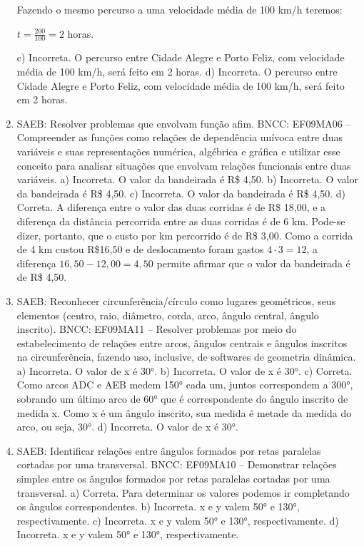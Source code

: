 \begin{enumerate}
Fazendo o mesmo percurso a uma velocidade média de 100 km/h teremos:

$t = \frac{200}{100} = 2$ horas.

c) Incorreta. O percurso entre Cidade Alegre e Porto Feliz, com velocidade 
média de 100 km/h, será feito em 2 horas. 
d) Incorreta. O percurso entre Cidade Alegre e Porto Feliz, com velocidade 
média de 100 km/h, será feito em 2 horas.

\item
SAEB: Resolver problemas que envolvam função afim.
BNCC: EF09MA06 -- Compreender as funções como relações de dependência
unívoca entre duas variáveis e suas representações numérica, algébrica e
gráfica e utilizar esse conceito para analisar situações que envolvam
relações funcionais entre duas variáveis.
a) Incorreta. O valor da bandeirada é R\$ 4,50.
b) Incorreta. O valor da bandeirada é R\$ 4,50.
c) Incorreta. O valor da bandeirada é R\$ 4,50.
d) Correta. A diferença entre o valor das duas corridas é de R\$ 18,00, 
e a diferença da distância percorrida entre as duas corridas é de 6 km. 
Pode-se dizer, portanto, que o custo por km percorrido é de R\$ 3,00. Como a
corrida de 4 km custou R\$16,50 e de deslocamento foram gastos $4 \cdot 3 = 12$,
a diferença $16,50 - 12,00 = 4,50$ permite afirmar que o valor da bandeirada é 
de R\$ 4,50.

\item
SAEB: Reconhecer circunferência/círculo como lugares
geométricos, seus elementos (centro, raio, diâmetro, corda, arco, ângulo
central, ângulo inscrito).
BNCC: EF09MA11 -- Resolver problemas por meio do estabelecimento de
relações entre arcos, ângulos centrais e ângulos inscritos na
circunferência, fazendo uso, inclusive, de softwares de geometria
dinâmica.
a) Incorreta. O valor de x é 30°.
b) Incorreta. O valor de x é 30°.
c) Correta. Como arcos ADC e AEB medem 150° cada um, juntos correspondem a 300°,
sobrando um último arco de 60° que é correspondente do ângulo inscrito
de medida x. Como x é um ângulo inscrito, sua medida é metade da medida
do arco, ou seja, 30°.
d) Incorreta. O valor de x é 30°.

\item
SAEB: Identificar relações entre ângulos formados por retas
paralelas cortadas por uma transversal.
BNCC: EF09MA10 -- Demonstrar relações simples entre os ângulos formados
por retas paralelas cortadas por uma transversal.
a) Correta. Para determinar os valores podemos ir completando os ângulos
correspondentes.
b) Incorreta. x e y valem 50° e 130°, respectivamente.
c) Incorreta. x e y valem 50° e 130°, respectivamente.
d) Incorreta. x e y valem 50° e 130°, respectivamente.


\end{enumerate}
